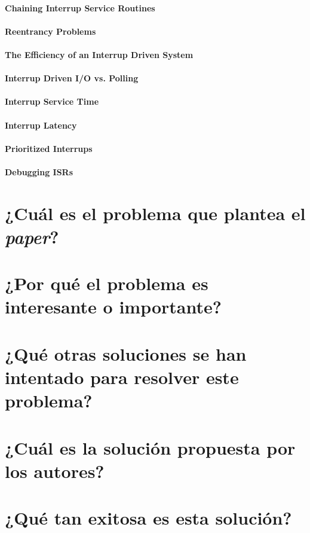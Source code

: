 \paragraph{\textnormal{\textbf{Chaining Interrup Service Routines}}}

\paragraph{\textnormal{\textbf{Reentrancy Problems}}}

\paragraph{\textnormal{\textbf{The Efficiency of an Interrup Driven System}}}

\paragraph{Interrup Driven I/O vs. Polling}

\paragraph{Interrup Service Time}

\paragraph{Interrup Latency}

\paragraph{Prioritized Interrups}

\paragraph{Debugging ISRs}

\section{¿Cuál es el problema que plantea el \textit{paper}?}

\section{¿Por qué el problema es interesante o importante?}

\section{¿Qué otras soluciones se han intentado para resolver este problema?}     

\section{¿Cuál es la solución propuesta por los autores?}

\section{¿Qué tan exitosa es esta solución?}
